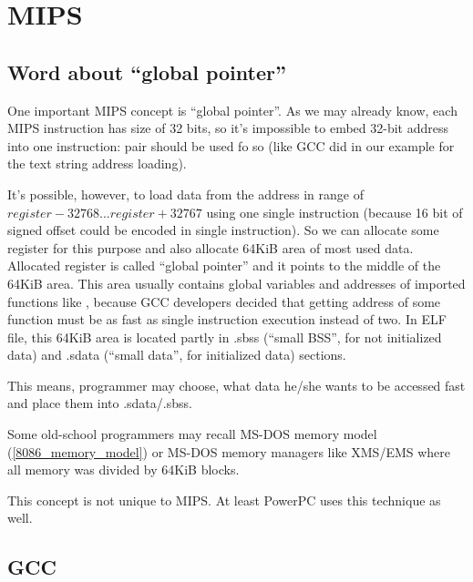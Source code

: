 ﻿\ifx\RUSSIAN\undefined
\section{MIPS}

\subsection{Word about ``global pointer''}
\label{MIPS_GP}

One important MIPS concept is ``global pointer''.
As we may already know, each MIPS instruction has size of 32 bits, so it's impossible to embed 32-bit
address into one instruction: pair should be used fo so (like GCC did in our example for the text string address
loading).

It's possible, however, to load data from the address in range of $register-32768...register+32767$ using one
single instruction (because 16 bit of signed offset could be encoded in single instruction).
So we can allocate some register for this purpose and also allocate 64KiB area of most used data.
Allocated register is called ``global pointer'' and it points to the middle of the 64KiB area.
This area usually contains global variables and addresses of imported functions like \printf, 
because GCC developers decided that getting address of some function must be as fast as single instruction
execution instead of two.
In ELF file, this 64KiB area is located partly in .sbss (``small \ac{BSS}'', for not initialized data) and 
.sdata (``small data'', for initialized data) sections.

This means, programmer may choose, what data he/she wants to be accessed fast and place them into .sdata/.sbss.

Some old-school programmers may recall MS-DOS memory model (\ref{8086_memory_model}) 
or MS-DOS memory managers like XMS/EMS where all memory was divided by 64KiB blocks.

This concept is not unique to MIPS. At least PowerPC uses this technique as well.

\subsection{\Optimizing GCC}



